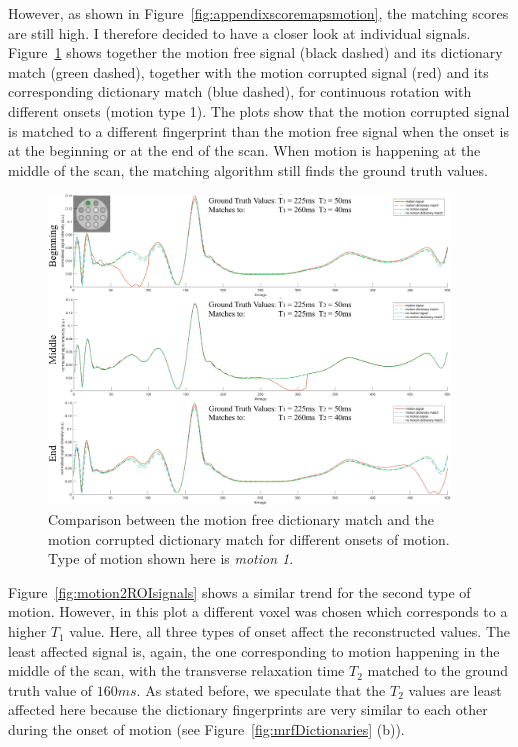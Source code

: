 However, as shown in Figure~\ref{fig:appendixscoremapsmotion}, the matching scores are still high. 
I therefore decided to have a closer look at individual signals. 
Figure~\ref{fig:motion1ROIsignals} shows together the motion free signal (black dashed) and its dictionary match (green dashed), together with the motion corrupted signal (red) and its corresponding dictionary match (blue dashed), for continuous rotation with different onsets (motion type 1).
The plots show that the motion corrupted signal is matched to a different fingerprint than the motion free signal when the onset is at the beginning or at the end of the scan.
When motion is happening at the middle of the scan, the matching algorithm still finds the ground truth values.

\begin{figure}[ht]
    \centering
    \includegraphics[width=0.95\textwidth]{images/mrf/motion1ROIsignals}
    \caption{Comparison between the motion free dictionary match and the motion corrupted dictionary match for different onsets of motion. Type of motion shown here is \textit{motion 1}.}
    \label{fig:motion1ROIsignals}
\end{figure}

\hfill

Figure~\ref{fig:motion2ROIsignals} shows a similar trend for the second type of motion.
However, in this plot a different voxel was chosen which corresponds to a higher $T_1$ value.
Here, all three types of onset affect the reconstructed values.
The least affected signal is, again, the one corresponding to motion happening in the middle of the scan, with the transverse relaxation time $T_2$ matched to the ground truth value of $160ms$.
As stated before, we speculate that the $T_2$ values are least affected here because the dictionary fingerprints are very similar to each other during the onset of motion (see  Figure~\ref{fig:mrfDictionaries} (b)).

